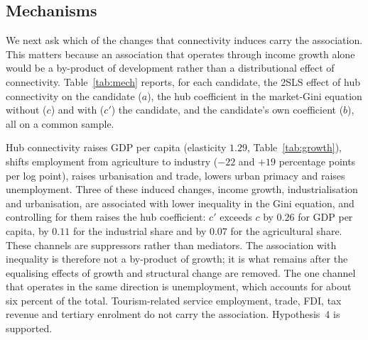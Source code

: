 \subsection{Mechanisms}
\label{sec:mech}
We next ask which of the changes that connectivity induces carry the association. This matters because an association that operates through income growth alone would be a by-product of development rather than a distributional effect of connectivity. Table~\ref{tab:mech} reports, for each candidate, the 2SLS effect of hub connectivity on the candidate ($a$), the hub coefficient in the market-Gini equation without ($c$) and with ($c'$) the candidate, and the candidate's own coefficient ($b$), all on a common sample.

Hub connectivity raises GDP per capita (elasticity $1.29$, Table~\ref{tab:growth}), shifts employment from agriculture to industry ($-22$ and $+19$ percentage points per log point), raises urbanisation and trade, lowers urban primacy and raises unemployment. Three of these induced changes, income growth, industrialisation and urbanisation, are associated with lower inequality in the Gini equation, and controlling for them raises the hub coefficient: $c'$ exceeds $c$ by $0.26$ for GDP per capita, by $0.11$ for the industrial share and by $0.07$ for the agricultural share. These channels are suppressors rather than mediators. The association with inequality is therefore not a by-product of growth; it is what remains after the equalising effects of growth and structural change are removed. The one channel that operates in the same direction is unemployment, which accounts for about six percent of the total. Tourism-related service employment, trade, FDI, tax revenue and tertiary enrolment do not carry the association. Hypothesis~4 is supported.

